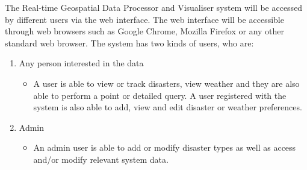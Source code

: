 The Real-time Geospatial Data Processor and Visualiser system will be accessed by different users via the web interface. The web interface will be accessible through web browsers such as Google Chrome, Mozilla Firefox or any other standard web browser.\newline  
The system has two kinds of users, who are:
\begin{enumerate}	
	\item Any person interested in the data
		\begin{itemize}
			\item A user is able to view or track disasters, view weather and they are also able to perform a point or detailed query. A user registered with the system is also able to add, view and edit disaster or weather preferences.
		\end{itemize}
	\item Admin
		\begin{itemize}
			\item An admin user is able to add or modify disaster types as well as access and/or modify relevant system data.
		\end{itemize}
\end{enumerate}
